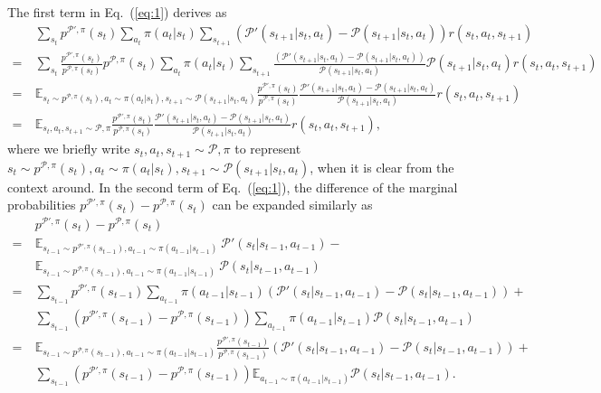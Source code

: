 \documentclass[letterpaper]{article} %
\def\E{{\mathbb{E}}}
\def\P{{\mathcal{P}}}
\begin{document}
The first term in Eq.~(\ref{eq:1}) derives as
{\small
\begin{align*}
\ &\sum_{s_t}p^{\P',\pi}(s_t)
\sum_{a_t}\pi(a_t|s_t)
\sum_{s_{t+1}}\left(\P'(s_{t+1}|s_t,a_t)-\P(s_{t+1}|s_t,a_t)\right)
r(s_t,a_t,s_{t+1})
\\
=\ &\sum_{s_t}\frac{p^{\P',\pi}(s_t)}{p^{\P,\pi}(s_t)}p^{\P,\pi}(s_t)
\sum_{a_t}\pi(a_t|s_t)
\sum_{s_{t+1}}\frac{\left(\P'(s_{t+1}|s_t,a_t)-\P(s_{t+1}|s_t,a_t)\right)}{\P(s_{t+1}|s_t,a_t)}\P(s_{t+1}|s_t,a_t)
r(s_t,a_t,s_{t+1})
\\
=\ &\E_{s_t\sim p^{\P,\pi}(s_t),a_t\sim\pi(a_t|s_t),s_{t+1}\sim\P(s_{t+1}|s_t,a_t)}
\frac{p^{\P',\pi}(s_t)}{p^{\P,\pi}(s_t)}\frac{\P'(s_{t+1}|s_t,a_t)-\P(s_{t+1}|s_t,a_t)}{\P(s_{t+1}|s_t,a_t)}r(s_t,a_t,s_{t+1})
\\
=\ &\E_{s_t,a_t,s_{t+1}\sim \P,\pi}
\frac{p^{\P',\pi}(s_t)}{p^{\P,\pi}(s_t)}\frac{\P'(s_{t+1}|s_t,a_t)-\P(s_{t+1}|s_t,a_t)}{\P(s_{t+1}|s_t,a_t)}r(s_t,a_t,s_{t+1}),
\end{align*}
}\noindent
where we briefly write $s_t,a_t,s_{t+1}\sim \P,\pi$ to represent $s_t\sim p^{\P,\pi}(s_t),a_t\sim\pi(a_t|s_t),s_{t+1}\sim\P(s_{t+1}|s_t,a_t)$, when it is clear from the context around. In the second term of Eq.~(\ref{eq:1}), the difference of the marginal probabilities $p^{\P',\pi}(s_t)-p^{\P,\pi}(s_t)$ can be expanded similarly as
{\small
\begin{align}
&p^{\P',\pi}(s_t)-p^{\P,\pi}(s_t)
\nonumber
\\
=\ &\E_{s_{t-1}\sim p^{\P',\pi}(s_{t-1}),a_{t-1}\sim\pi(a_{t-1}|s_{t-1})}\ \P'(s_t|s_{t-1},a_{t-1})-
\nonumber
\\
\ &\E_{s_{t-1}\sim p^{\P,\pi}(s_{t-1}),a_{t-1}\sim\pi(a_{t-1}|s_{t-1})}\ \P(s_t|s_{t-1},a_{t-1})
\nonumber
\\
=\ &\sum_{s_{t-1}}p^{\P',\pi}(s_{t-1})\sum_{a_{t-1}}\pi(a_{t-1}|s_{t-1})
\left(\P'(s_t|s_{t-1},a_{t-1})-\P(s_t|s_{t-1},a_{t-1})\right)+
\nonumber
\\
\ &\sum_{s_{t-1}}\left(p^{\P',\pi}(s_{t-1})-p^{\P,\pi}(s_{t-1})\right)\sum_{a_{t-1}}\pi(a_{t-1}|s_{t-1})
\P(s_t|s_{t-1},a_{t-1})
\nonumber
\\
=\ &\E_{s_{t-1}\sim p^{\P,\pi}(s_{t-1}),a_{t-1}\sim\pi(a_{t-1}|s_{t-1})}
\frac{p^{\P',\pi}(s_{t-1})}{p^{\P,\pi}(s_{t-1})}\left(\P'(s_t|s_{t-1},a_{t-1})-\P(s_t|s_{t-1},a_{t-1})\right)+
\nonumber
\\
\ &\sum_{s_{t-1}}\left(p^{\P',\pi}(s_{t-1})-p^{\P,\pi}(s_{t-1})\right)\E_{a_{t-1}\sim\pi(a_{t-1}|s_{t-1})}\P(s_t|s_{t-1},a_{t-1}).
\label{eq:2}
\end{align}
}\noindent
\end{document}
